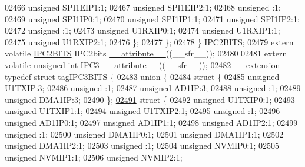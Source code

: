 \begin{DoxyCode}
02466       \textcolor{keywordtype}{unsigned} SPI1EIP1:1;
02467       \textcolor{keywordtype}{unsigned} SPI1EIP2:1;
02468       \textcolor{keywordtype}{unsigned} :1;
02469       \textcolor{keywordtype}{unsigned} SPI1IP0:1;
02470       \textcolor{keywordtype}{unsigned} SPI1IP1:1;
02471       \textcolor{keywordtype}{unsigned} SPI1IP2:1;
02472       \textcolor{keywordtype}{unsigned} :1;
02473       \textcolor{keywordtype}{unsigned} U1RXIP0:1;
02474       \textcolor{keywordtype}{unsigned} U1RXIP1:1;
02475       \textcolor{keywordtype}{unsigned} U1RXIP2:1;
02476     \};
02477   \};
02478 \} \hyperlink{a00014_d2/ddf/a00544}{IPC2BITS};
02479 \textcolor{keyword}{extern} \textcolor{keyword}{volatile} \hyperlink{a00014_d2/ddf/a00544}{IPC2BITS} IPC2bits \hyperlink{a00015_a493c46f03454991ccc5aa7a6e1dfb2a7}{\_\_attribute\_\_}((\_\_sfr\_\_));
02480 
02481 \textcolor{keyword}{extern} \textcolor{keyword}{volatile} \textcolor{keywordtype}{unsigned} \textcolor{keywordtype}{int}  IPC3 \hyperlink{a00015_a493c46f03454991ccc5aa7a6e1dfb2a7}{\_\_attribute\_\_}((\_\_sfr\_\_));
\hypertarget{a00015_source_l02482}{}\hyperlink{a00014}{02482} \_\_extension\_\_ \textcolor{keyword}{typedef} \textcolor{keyword}{struct }tagIPC3BITS \{
\hypertarget{a00015_source_l02483}{}\hyperlink{a00015}{02483}   \textcolor{keyword}{union }\{
\hypertarget{a00015_source_l02484}{}\hyperlink{a00015}{02484}     \textcolor{keyword}{struct }\{
02485       \textcolor{keywordtype}{unsigned} U1TXIP:3;
02486       \textcolor{keywordtype}{unsigned} :1;
02487       \textcolor{keywordtype}{unsigned} AD1IP:3;
02488       \textcolor{keywordtype}{unsigned} :1;
02489       \textcolor{keywordtype}{unsigned} DMA1IP:3;
02490     \};
\hypertarget{a00015_source_l02491}{}\hyperlink{a00015}{02491}     \textcolor{keyword}{struct }\{
02492       \textcolor{keywordtype}{unsigned} U1TXIP0:1;
02493       \textcolor{keywordtype}{unsigned} U1TXIP1:1;
02494       \textcolor{keywordtype}{unsigned} U1TXIP2:1;
02495       \textcolor{keywordtype}{unsigned} :1;
02496       \textcolor{keywordtype}{unsigned} AD1IP0:1;
02497       \textcolor{keywordtype}{unsigned} AD1IP1:1;
02498       \textcolor{keywordtype}{unsigned} AD1IP2:1;
02499       \textcolor{keywordtype}{unsigned} :1;
02500       \textcolor{keywordtype}{unsigned} DMA1IP0:1;
02501       \textcolor{keywordtype}{unsigned} DMA1IP1:1;
02502       \textcolor{keywordtype}{unsigned} DMA1IP2:1;
02503       \textcolor{keywordtype}{unsigned} :1;
02504       \textcolor{keywordtype}{unsigned} NVMIP0:1;
02505       \textcolor{keywordtype}{unsigned} NVMIP1:1;
02506       \textcolor{keywordtype}{unsigned} NVMIP2:1;

\end{DoxyCode}
